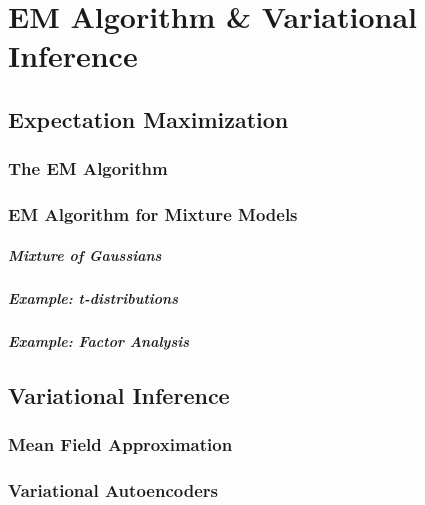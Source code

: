 
\chapter{EM Algorithm \& Variational Inference}
\label{chapter9}

\section{Expectation Maximization}

\subsection{The EM Algorithm}

\subsection{EM Algorithm for Mixture Models}

\paragraph{Mixture of Gaussians}

\paragraph{Example: t-distributions}

\paragraph{Example: Factor Analysis}

\section{Variational Inference}

\subsection{Mean Field Approximation}

\subsection{Variational Autoencoders}